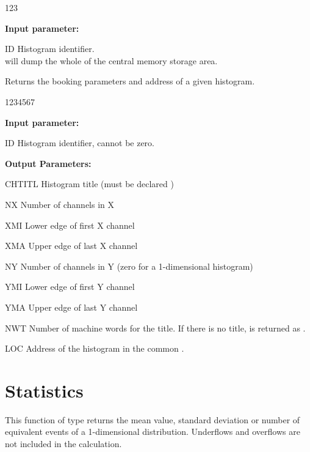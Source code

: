 \begin{DLtt}{123}
\item[{\rm\bf Input parameter:}]
\item[ID] Histogram identifier.\\
 will dump the whole of the  central memory storage area.
\end{DLtt}
 
 
\Action
Returns the booking parameters and address of a given histogram.
 
\begin{DLtt}{1234567}
\item[{\rm\bf Input parameter:}]
\item[ID] Histogram identifier, cannot be zero.
\item[{\rm\bf Output Parameters:}]
\item[CHTITL] Histogram title (must be declared )
\item[NX ] Number of channels in X
\item[XMI] Lower edge of first X channel
\item[XMA] Upper edge of last X channel
\item[NY] Number of channels in Y (zero for a 1-dimensional histogram)
\item[YMI] Lower edge of first Y channel
\item[YMA] Upper edge of last Y channel
\item[NWT] Number of machine words for the title.
If there is no title,  is returned as  .
\item[LOC] Address of the histogram in the common .
\end{DLtt}
 

\section{Statistics}
\label{HSTATIS2}
 
 
\Action
{}
This function of type  returns the mean value, standard deviation
or number of equivalent events of a 1-dimensional distribution.
Underflows and overflows are not included in the calculation.
 
